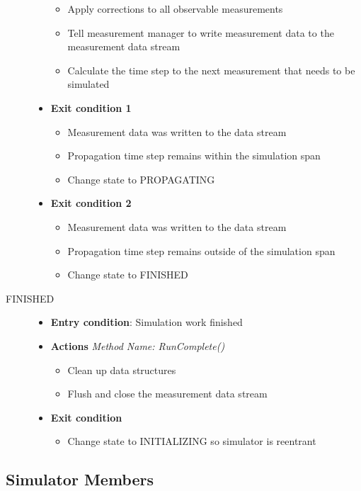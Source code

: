 \begin{description}
\begin{itemize}
\begin{itemize}
\item Apply corrections to all observable measurements
\item Tell measurement manager to write measurement data to the measurement data stream
\item Calculate the time step to the next measurement that needs to be simulated
\end{itemize}
\item \textbf{Exit condition 1}
\begin{itemize}
\item Measurement data was written to the data stream
\item Propagation time step remains within the simulation span
\item Change state to PROPAGATING
\end{itemize}
\item \textbf{Exit condition 2}
\begin{itemize}
\item Measurement data was written to the data stream
\item Propagation time step remains outside of the simulation span
\item Change state to FINISHED
\end{itemize}
\end{itemize}
\item [FINISHED]\hspace{1pt}
\begin{itemize}
\item \textbf{Entry condition}:  Simulation work finished
\item \textbf{Actions} \textit{Method Name:  RunComplete()}
\begin{itemize}
\item Clean up data structures
\item Flush and close the measurement data stream
\end{itemize}
\item \textbf{Exit condition}
\begin{itemize}
\item Change state to INITIALIZING so simulator is reentrant
\end{itemize}
\end{itemize}
\end{description}

\subsection{Simulator Members}

